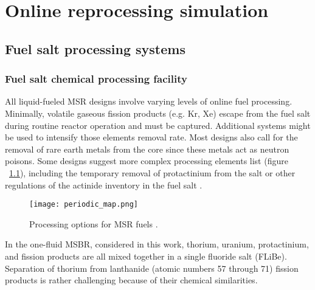 \chapter[Online reprocessing simulation]{Online reprocessing simulation}

\section{Fuel salt processing systems}
\subsection{Fuel salt chemical processing facility}
All liquid-fueled \gls{MSR} designs involve varying levels of online fuel processing. Minimally, volatile gaseous fission products (e.g. Kr, Xe) escape from the fuel salt during routine reactor operation and must be captured. Additional systems might be used to intensify those elements removal rate. Most designs also call for the removal of rare earth metals from the core since these metals act as neutron poisons. Some designs suggest more complex processing elements list (figure ~\ref{fig:periodic_tab}), including the temporary removal of protactinium from the salt or other regulations of the actinide inventory in the fuel salt \cite{ahmad_neutronics_2015}.

\begin{figure}[htp!] %
  \centering
  \vspace{-0.3em}
  \texttt{[image: periodic\_map.png]}
  \caption{Processing options for \gls{MSR} fuels \cite{ahmad_neutronics_2015}.}
  \vspace{-0.6em}
  \label{fig:periodic_tab}
\end{figure}
\FloatBarrier

In the one-fluid \gls{MSBR}, considered in this work, thorium, uranium, protactinium, and fission products are all mixed together in a single fluoride salt (FLiBe). Separation of thorium from lanthanide (atomic numbers 57 through 71) fission products is rather challenging because of their chemical similarities. 


